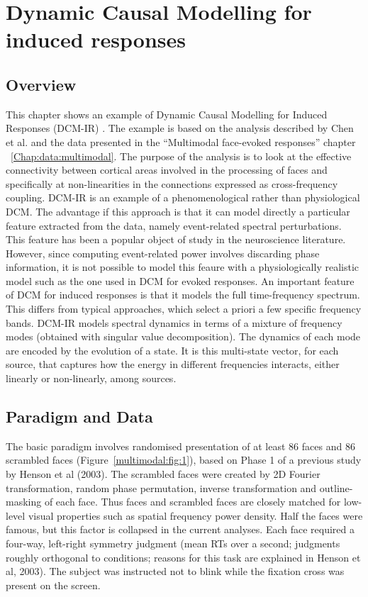 \chapter{Dynamic Causal Modelling for induced responses \label{Chap:data:dcm-ir}}

\section{Overview}

This chapter shows an example of Dynamic Causal Modelling for Induced Responses (DCM-IR) \cite{cc_induced}. The example is based on the analysis described by Chen et al. \cite{cc_asymm} and the data presented in the ``Multimodal face-evoked responses'' chapter ~\ref{Chap:data:multimodal}. The purpose of the analysis is to look at the effective connectivity between cortical areas involved in the processing of faces and specifically at non-linearities in the connections expressed as cross-frequency coupling. DCM-IR is an example of a phenomenological rather than physiological DCM. The advantage if this approach is that it can model directly a particular feature extracted from the data, namely event-related spectral perturbations. This feature has been a popular object of study in the neuroscience literature. However, since computing event-related power involves discarding phase information, it is not possible to model this feaure with a physiologically realistic model such as the one used in DCM for evoked responses. An important feature of DCM for induced responses is that it models the full time-frequency spectrum. This differs from typical approaches, which select a priori a few specific frequency bands. DCM-IR models spectral dynamics in terms of a mixture of frequency modes (obtained with singular value decomposition). The dynamics of each mode are encoded by the evolution of a state. It is this multi-state vector, for each source, that captures how the energy in different frequencies interacts, either linearly or non-linearly, among sources.

\section{Paradigm and Data}

The basic paradigm involves randomised presentation of at least 86 faces and 86 scrambled faces (Figure~\ref{multimodal:fig:1}), based on Phase 1 of a previous study by Henson et al (2003). The scrambled faces were created by 2D Fourier transformation, random phase permutation, inverse transformation and outline-masking of each face. Thus faces and scrambled faces are closely matched for low-level visual properties such as spatial frequency power density. Half the faces were famous, but this factor is collapsed in the current analyses. Each face required a four-way, left-right symmetry judgment (mean RTs over a second; judgments roughly orthogonal to conditions; reasons for this task are explained in Henson et al, 2003). The subject was instructed not to blink while the fixation cross was present on the screen.

